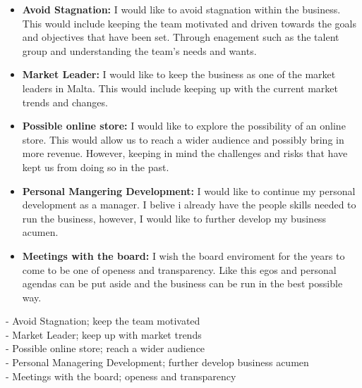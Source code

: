 \documentclass{article}
\begin{document}
\begin{itemize}
    \item \textbf{Avoid Stagnation:} I would like to avoid stagnation within the business. This would include keeping the team motivated and driven towards the goals and objectives that have been set. Through enagement such as the talent group and understanding the team's needs and wants. \\
    \item \textbf{Market Leader:} I would like to keep the business as one of the market leaders in Malta. This would include keeping up with the current market trends and changes.
    \item \textbf{Possible online store:} I would like to explore the possibility of an online store. This would allow us to reach a wider audience and possibly bring in more revenue. However, keeping in mind the challenges and risks that have kept us from doing so in the past. \\
    \item \textbf{Personal Mangering Development:} I would like to continue my personal development as a manager. I belive i already have the people skills needed to run the business, however, I would like to further develop my business acumen. \\
    \item \textbf{Meetings with the board:} I wish the board enviroment for the years to come to be one of openess and transparency. Like this egos and personal agendas can be put aside and the business can be run in the best possible way. \\
\end{itemize}
- Avoid Stagnation; keep the team motivated \\
- Market Leader; keep up with market trends \\
- Possible online store; reach a wider audience \\
- Personal Managering Development; further develop business acumen \\
- Meetings with the board; openess and transparency \\
\end{document}
